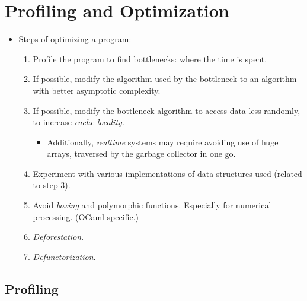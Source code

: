 \documentclass{beamer}
\newcommand{\tmem}[1]{{\em #1\/}}
\begin{document}
\section{Profiling and Optimization}

\begin{itemize}
  \item Steps of optimizing a program:
  \begin{enumerate}
    \item Profile the program to find bottlenecks: where the time is spent.
    
    \item If possible, modify the algorithm used by the bottleneck to an
    algorithm with better asymptotic complexity.
    
    \item If possible, modify the bottleneck algorithm to access data less
    randomly, to increase {\tmem{cache locality}}.
    \begin{itemize}
      \item Additionally, {\tmem{realtime}} systems may require avoiding use
      of huge arrays, traversed by the garbage collector in one go.
    \end{itemize}
    \item Experiment with various implementations of data structures used
    {\small{(related to step 3).}}
    
    \item Avoid {\tmem{boxing}} and polymorphic functions. Especially for
    numerical processing. (OCaml specific.)
    
    \item {\tmem{Deforestation}}.
    
    \item {\tmem{Defunctorization}}.
  \end{enumerate}
\end{itemize}

\subsection{Profiling}
\end{document}
